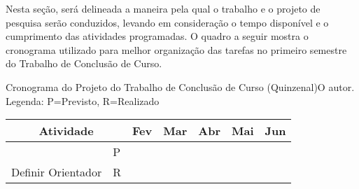 \label{cap:cronograma}

Nesta seção, será delineada a maneira pela qual o trabalho e o projeto de pesquisa serão conduzidos,
levando em consideração o tempo disponível e o cumprimento das atividades programadas.
O quadro a seguir mostra o cronograma utilizado para melhor organização das tarefas no primeiro semestre do Trabalho de Conclusão de Curso.

\begin{tabela}{Cronograma do Projeto do Trabalho de Conclusão de Curso (Quinzenal)}{O autor. Legenda: P=Previsto, R=Realizado}
    \label{tab:cronograma1}
    \begin{tabular}{|cl|ll|ll|ll|ll|ll|}
        \hline
        \multicolumn{2}{|c|}{\cellcolor[HTML]{C0C0C0}\textbf{Atividade}}                                                                                 & \multicolumn{2}{c|}{\cellcolor[HTML]{C0C0C0}\textbf{Fev}}               & \multicolumn{2}{c|}{\cellcolor[HTML]{C0C0C0}\textbf{Mar}}                                                              & \multicolumn{2}{c|}{\cellcolor[HTML]{C0C0C0}\textbf{Abr}}                                                              & \multicolumn{2}{c|}{\cellcolor[HTML]{C0C0C0}\textbf{Mai}}                                                              & \multicolumn{2}{c|}{\cellcolor[HTML]{C0C0C0}\textbf{Jun}}                                                              \\ \hline
        \multicolumn{1}{|c|}{}                                                                                                                       & P & \multicolumn{1}{l|}{} & \cellcolor[HTML]{3166FF}{\color[HTML]{333333} } & \multicolumn{1}{l|}{}                                                &                                                 & \multicolumn{1}{l|}{}                                                &                                                 & \multicolumn{1}{l|}{}                                                &                                                 & \multicolumn{1}{l|}{}                                                &                                                 \\ \cline{2-12} 
        \multicolumn{1}{|c|}{\multirow{-2}{*}{Definir Orientador}}                                                                                   & R & \multicolumn{1}{l|}{} & \cellcolor[HTML]{32CB00}                        & \multicolumn{1}{l|}{}                                                &                                                 & \multicolumn{1}{l|}{}                                                &                                                 & \multicolumn{1}{l|}{}                                                &                                                 & \multicolumn{1}{l|}{}                                                &                                                 \\ \hline

\end{tabular}
\end{tabela}
